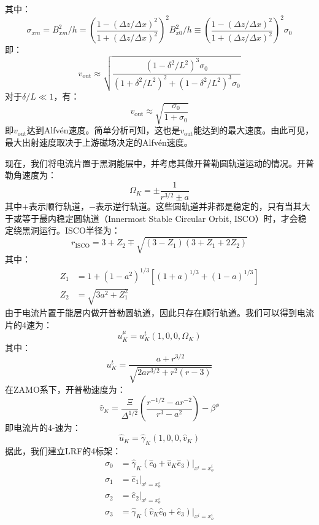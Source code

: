 \documentclass[lang=cn,color=blue,cm,11pt,scheme=chinese,bibend=bibtex,sorting=nty]{elegantbook}
\begin{document}
	其中：
	\begin{equation}
		\sigma_{x m} = B^2_{x m} / h = \left( \frac{1 - (\Delta z / \Delta x)^2}{1 + (\Delta z / \Delta x)^2} \right)^2 B^2_{x 0} / h \equiv \left( \frac{1 - (\Delta z / \Delta x)^2}{1 + (\Delta z / \Delta x)^2} \right)^2 \sigma_0
	\end{equation}
	即：
	\[ v_{\text{out}} \approx \sqrt{\frac{(1 - \delta^2 / L^2)^3 \sigma_0}{(1 + \delta^2 / L^2)^2 + (1 - \delta^2 / L^2)^3 \sigma_0}} \]
	对于$\delta / L \ll 1$，有：
	\[ v_{\text{out}} \approx \sqrt{\frac{\sigma_0}{1 + \sigma_0}} \]
	即$v_{\text{out}}$达到Alfvén速度。简单分析可知，这也是$v_{\text{out}}$能达到的最大速度。由此可见，最大出射速度取决于上游磁场决定的Alfvén速度。
	
	现在，我们将电流片置于黑洞能层中，并考虑其做开普勒圆轨道运动的情况。开普勒角速度为：
	\begin{equation}
		\Omega_K = \pm \frac{1}{r^{3 / 2} \pm a}
	\end{equation}
	其中$+$表示顺行轨道，$-$表示逆行轨道。这些圆轨道并非都是稳定的，只有当其大于或等于最内稳定圆轨道（Innermost Stable Circular Orbit, ISCO）时，才会稳定绕黑洞运行。ISCO半径为：
	\begin{equation}
		r_{\text{ISCO}} = 3 + Z_2 \mp \sqrt{(3 - Z_1) (3 + Z_1 + 2 Z_2)}
	\end{equation}
	其中：
	\begin{align}
		Z_1 &= 1 + (1 - a^2)^{1 / 3} [(1 + a)^{1 / 3} + (1 - a)^{1 / 3}] \\
		Z_2 &= \sqrt{3 a^2 + Z^2_1}
	\end{align}
	由于电流片置于能层内做开普勒圆轨道，因此只存在顺行轨道。我们可以得到电流片的4速为：
	\begin{equation}
		u_K^{\mu} = u^t_K (1, 0, 0, \Omega_K)
	\end{equation}
	其中：
	\begin{equation}
		u^t_K = \frac{a + r^{3 / 2}}{\sqrt{2 a r^{3 / 2} + r^2 (r - 3)}}
	\end{equation}
	在ZAMO系下，开普勒速度为：
	\begin{equation}
		\hat{v}_K = \frac{\Xi}{\Delta^{1 / 2}} \left( \frac{r^{- 1 / 2} - a r^{-2}}{r^3 - a^2} \right) - \beta^{\phi}
	\end{equation}
	即电流片的4-速为：
	\begin{equation}
		\hat{u}_K = \hat{\gamma}_K (1, 0, 0, \hat{v}_K)
	\end{equation}
	据此，我们建立LRF的4标架：
	\begin{equation}
		\begin{aligned}
			\sigma_0 & = \hat{\gamma}_K (\hat{e}_0 + \hat{v}_K \hat{e}_3) |_{x^i = x^i_o}\\
			\sigma_1 & = \hat{e}_1 |_{x^i = x^i_o}\\
			\sigma_2 & = \hat{e}_2 |_{x^i = x^i_o}\\
			\sigma_3 & = \hat{\gamma}_K (\hat{v}_K  \hat{e}_0 + \hat{e}_3) |_{x^i = x^i_o}
		\end{aligned}
	\end{equation}
\end{document}
